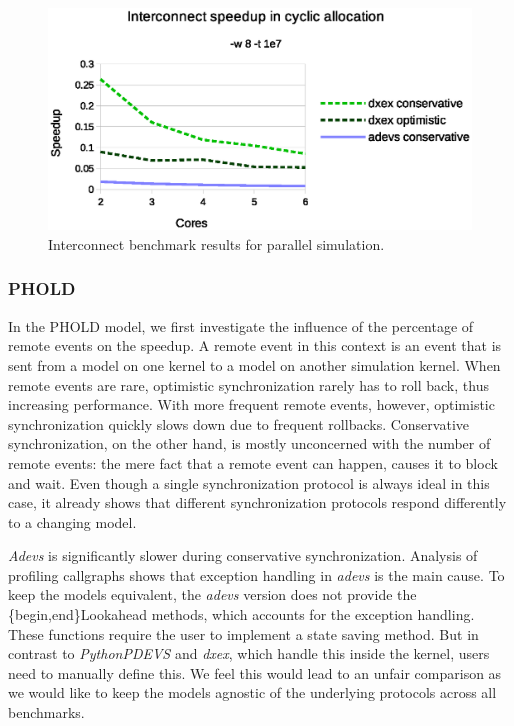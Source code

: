 \begin{figure}
	\center
	\includegraphics[width=\columnwidth]{fig/interconnect_parallel.eps}
	\caption{Interconnect benchmark results for parallel simulation.}
	\label{fig:interconnect_benchmark_parallel}
\end{figure}

\subsubsection{PHOLD}
In the PHOLD model, we first investigate the influence of the percentage of remote events on the speedup.
A remote event in this context is an event that is sent from a model on one kernel to a model on another simulation kernel.
When remote events are rare, optimistic synchronization rarely has to roll back, thus increasing performance.
With more frequent remote events, however, optimistic synchronization quickly slows down due to frequent rollbacks.
Conservative synchronization, on the other hand, is mostly unconcerned with the number of remote events: the mere fact that a remote event can happen, causes it to block and wait.
Even though a single synchronization protocol is always ideal in this case, it already shows that different synchronization protocols respond differently to a changing model.

\textit{Adevs} is significantly slower during conservative synchronization.
Analysis of profiling callgraphs shows that exception handling in \textit{adevs} is the main cause. 
To keep the models equivalent, the \textit{adevs} version does not provide the \{begin,end\}Lookahead methods, which accounts for the exception handling.
These functions require the user to implement a state saving method.
But in contrast to \textit{PythonPDEVS} and \textit{dxex}, which handle this inside the kernel, users need to manually define this.
We feel this would lead to an unfair comparison as we would like to keep the models agnostic of the underlying protocols across all benchmarks.

